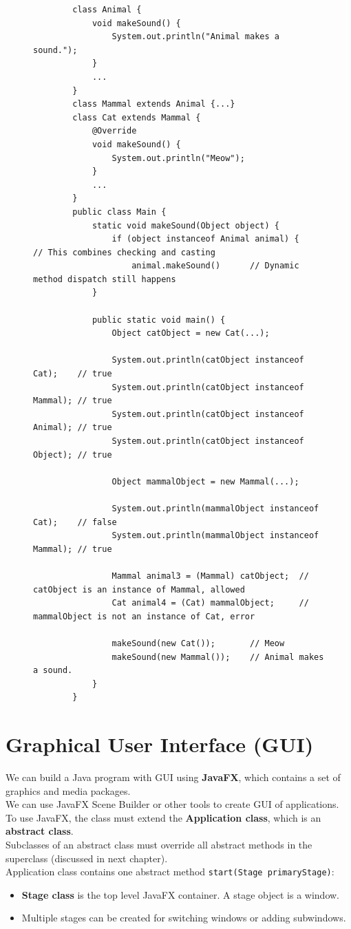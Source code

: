\documentclass{article}
\begin{document}
\begin{figure}[h]
	\begin{verbatim}
		class Animal {
		    void makeSound() {
		        System.out.println("Animal makes a sound.");
		    }
		    ...
		}
		class Mammal extends Animal {...}
		class Cat extends Mammal {
		    @Override
		    void makeSound() {
		        System.out.println("Meow");
		    }
		    ...
		}
		public class Main {
		    static void makeSound(Object object) {
		        if (object instanceof Animal animal) {     // This combines checking and casting
		            animal.makeSound() 		// Dynamic method dispatch still happens
		    } 
		    
		    public static void main() {
		        Object catObject = new Cat(...);
		        
		        System.out.println(catObject instanceof Cat);    // true
		        System.out.println(catObject instanceof Mammal); // true
		        System.out.println(catObject instanceof Animal); // true
		        System.out.println(catObject instanceof Object); // true
		        
		        Object mammalObject = new Mammal(...);
		        
		        System.out.println(mammalObject instanceof Cat);    // false
		        System.out.println(mammalObject instanceof Mammal); // true
		        
		        Mammal animal3 = (Mammal) catObject;  // catObject is an instance of Mammal, allowed
		        Cat animal4 = (Cat) mammalObject;     // mammalObject is not an instance of Cat, error
		        
		        makeSound(new Cat());       // Meow
		        makeSound(new Mammal());    // Animal makes a sound.
		    }
		}
	\end{verbatim}
\end{figure}

\newpage

\null
\newpage

\section{Graphical User Interface (GUI)}
We can build a Java program with GUI using \textbf{JavaFX}, which contains a set of graphics and media packages.\\
We can use JavaFX Scene Builder or other tools to create GUI of applications.\\
To use JavaFX, the class must extend the \textbf{Application class}, which is an \textbf{abstract class}.\\
Subclasses of an abstract class must override all abstract methods in the superclass (discussed in next chapter).\\
Application class contains one abstract method \texttt{start(Stage primaryStage)}:
\begin{itemize}
	\item \textbf{Stage class} is the top level JavaFX container. A stage object is a window.
	\item Multiple stages can be created for switching windows or adding subwindows.
\end{itemize}
\end{document}
